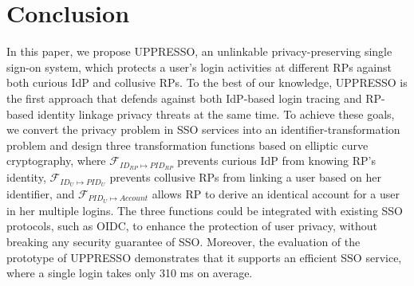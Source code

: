 \section{Conclusion}
\label{sec:conclusion}
In this paper, we propose UPPRESSO, an unlinkable privacy-preserving single sign-on system, which protects a user's login activities at different RPs against both curious IdP and collusive RPs. To the best of our knowledge, UPPRESSO is the first approach that defends against both IdP-based login tracing and RP-based identity linkage privacy threats at the same time. To achieve these goals, we convert the privacy problem in SSO services into an identifier-transformation problem and design three transformation functions based on elliptic curve cryptography, where $\mathcal{F}_{ID_{RP} \mapsto PID_{RP}}$ prevents curious IdP from knowing RP's identity, $\mathcal{F}_{ID_{U} \mapsto PID_{U}}$ prevents collusive RPs from linking a user based on her identifier, and $\mathcal{F}_{PID_{U} \mapsto Account}$ allows RP to derive an identical account for a user in her multiple logins. The three functions could be integrated with existing SSO protocols, such as OIDC, to enhance the protection of user privacy, without breaking any security guarantee of SSO. Moreover, the evaluation of the prototype of UPPRESSO demonstrates that it supports an efficient SSO service, where a single login takes only 310 ms on average.
